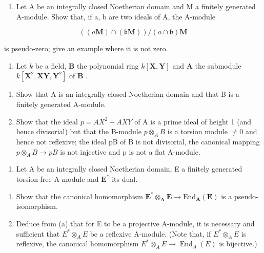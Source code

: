 \begin{enumerate}
\def\labelenumi{\arabic{enumi}.}
\setcounter{enumi}{4}
\tightlist
\item
  Let A be an integrally closed Noetherian domain and M a finitely generated A-module. Show that, if a, b are two ideals of A, the A-module
\end{enumerate}

\[
((a \mathbf {M}) \cap (\mathfrak {b} \mathbf {M})) / (a \cap \mathfrak {b}) \mathbf {M}
\]

is pseudo-zero; give an example where it is not zero.

\begin{enumerate}
\def\labelenumi{\arabic{enumi}.}
\setcounter{enumi}{5}
\tightlist
\item
  Let \(k\) be a field, \(\mathbf{B}\) the polynomial ring \(k[\mathbf{X},\mathbf{Y}]\) and \(\mathbf{A}\) the submodule \(k[\mathbf{X}^2,\mathbf{XY},\mathbf{Y}^2]\) of \(\mathbf{B}\) .
\end{enumerate}

\begin{enumerate}
\def\labelenumi{(\alph{enumi})}
\item
  Show that A is an integrally closed Noetherian domain and that B is a finitely generated A-module.
\item
  Show that the ideal \(p = AX^{2} + AXY\) of A is a prime ideal of height 1 (and hence divisorial) but that the B-module \(p \otimes_{A} B\) is a torsion module \(\neq 0\) and hence not reflexive; the ideal pB of B is not divisorial, the canonical mapping \(p \otimes_{A} B \to pB\) is not injective and p is not a flat A-module.
\end{enumerate}

\begin{enumerate}
\def\labelenumi{\arabic{enumi}.}
\setcounter{enumi}{6}
\tightlist
\item
  Let A be an integrally closed Noetherian domain, E a finitely generated torsion-free A-module and \(\mathbf{E}^*\) its dual.
\end{enumerate}

\begin{enumerate}
\def\labelenumi{(\alph{enumi})}
\item
  Show that the canonical homomorphism \(\mathbf{E}^{*}\otimes_{\mathbf{A}}\mathbf{E}\to \mathrm{End}_{\mathbf{A}}(\mathbf{E})\) is a pseudo-isomorphism.
\item
  Deduce from (a) that for E to be a projective A-module, it is necessary and sufficient that \(E^{*} \otimes_{A} E\) be a reflexive A-module. (Note that, if \(E^{*} \otimes_{A} E\) is reflexive, the canonical homomorphism \(E^{*} \otimes_{A} E \to \operatorname{End}_{A}(E)\) is bijective.)
\end{enumerate}

